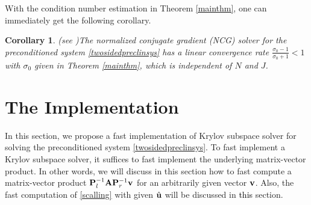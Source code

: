 \documentclass[11pt]{article}%
\numberwithin{equation}{section}
\newtheorem{remark}{Remark}
\newtheorem{corollary}[theorem]{Corollary}
\begin{document}
With the condition number estimation in Theorem \ref{mainthm}, one can immediately get the following corollary.
\begin{corollary}\textnormal{(see \cite[Theorem 38.5]{trefethen1997numerical})}\label{maincoroll}
	The normalized conjugate gradient (NCG) solver for the preconditioned system \eqref{twosidedpreclinsys} has a linear convergence rate $\frac{\sigma_0-1}{\sigma_0+1}<1$ with $\sigma_0$ given in Theorem \ref{mainthm}, which is independent of $N$ and $J$.
\end{corollary}

\section{The Implementation}\label{implementsection}
In this section, we propose a fast implementation of Krylov subspace solver for solving the preconditioned system \eqref{twosidedpreclinsys}. To fast implement a Krylov subspace solver, it suffices to fast implement the underlying matrix-vector product. In other words, we will discuss in this section how to fast compute a matrix-vector product ${\bf P}_l^{-1}{\bf A}{\bf P}_r^{-1}{\bf v}$ for an arbitrarily given vector ${\bf v}$. Also, the fast computation of \eqref{scalling} with given $\hat{\bf u}$ will be discussed in \textcolor{black}{this} section.
\end{document}
